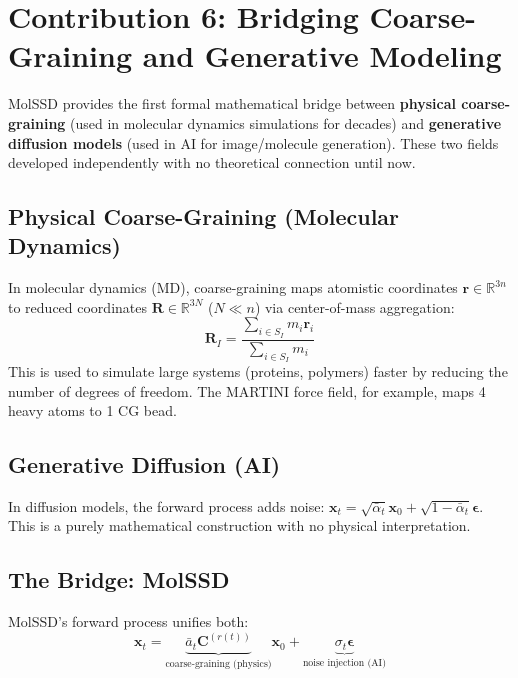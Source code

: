 \documentclass[12pt,a4paper]{article}
\newcommand{\R}{\mathbb{R}}
\begin{document}
\section{Contribution 6: Bridging Coarse-Graining and Generative Modeling}

\begin{noveltybox}
MolSSD provides the first formal mathematical bridge between \textbf{physical coarse-graining} (used in molecular dynamics simulations for decades) and \textbf{generative diffusion models} (used in AI for image/molecule generation). These two fields developed independently with no theoretical connection until now.
\end{noveltybox}

\subsection{Physical Coarse-Graining (Molecular Dynamics)}

In molecular dynamics (MD), coarse-graining maps atomistic coordinates $\bm{r} \in \R^{3n}$ to reduced coordinates $\bm{R} \in \R^{3N}$ ($N \ll n$) via center-of-mass aggregation:
\[
\bm{R}_I = \frac{\sum_{i \in S_I} m_i \bm{r}_i}{\sum_{i \in S_I} m_i}
\]
This is used to simulate large systems (proteins, polymers) faster by reducing the number of degrees of freedom. The MARTINI force field, for example, maps 4 heavy atoms to 1 CG bead.

\subsection{Generative Diffusion (AI)}

In diffusion models, the forward process adds noise: $\bm{x}_t = \sqrt{\bar{\alpha}_t} \bm{x}_0 + \sqrt{1 - \bar{\alpha}_t} \bm{\epsilon}$. This is a purely mathematical construction with no physical interpretation.

\subsection{The Bridge: MolSSD}

MolSSD's forward process unifies both:
\[
\bm{x}_t = \underbrace{\bar{a}_t \bm{C}^{(r(t))}}_{\text{coarse-graining (physics)}} \bm{x}_0 + \underbrace{\sigma_t \bm{\epsilon}}_{\text{noise injection (AI)}}
\]
\end{document}
